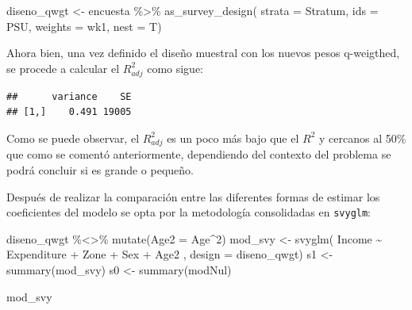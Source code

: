 \documentclass[
  12pt,
]{book}
\newenvironment{Shaded}{\begin{snugshade}}{\end{snugshade}}
\newcommand{\AttributeTok}[1]{\textcolor[rgb]{0.77,0.63,0.00}{#1}}
\newcommand{\DecValTok}[1]{\textcolor[rgb]{0.00,0.00,0.81}{#1}}
\newcommand{\FunctionTok}[1]{\textcolor[rgb]{0.00,0.00,0.00}{#1}}
\newcommand{\NormalTok}[1]{#1}
\newcommand{\OtherTok}[1]{\textcolor[rgb]{0.56,0.35,0.01}{#1}}
\newcommand{\SpecialCharTok}[1]{\textcolor[rgb]{0.00,0.00,0.00}{#1}}
\begin{document}
\begin{Shaded}
\begin{Highlighting}[]
\NormalTok{diseno\_qwgt }\OtherTok{\textless{}{-}}\NormalTok{ encuesta }\SpecialCharTok{\%\textgreater{}\%}
  \FunctionTok{as\_survey\_design}\NormalTok{(}
    \AttributeTok{strata =}\NormalTok{ Stratum,}
    \AttributeTok{ids =}\NormalTok{ PSU,}
    \AttributeTok{weights =}\NormalTok{ wk1,}
    \AttributeTok{nest =}\NormalTok{ T)}
\end{Highlighting}
\end{Shaded}

Ahora bien, una vez definido el diseño muestral con los nuevos pesos q-weigthed, se procede a calcular el \(R_{adj}^{2}\) como sigue:

\begin{Shaded}
\end{Shaded}

\begin{verbatim}
##      variance    SE
## [1,]    0.491 19005
\end{verbatim}

Como se puede observar, el \(R_{adj}^{2}\) es un poco más bajo que el \(R^{2}\) y cercanos al 50\% que como se comentó anteriormente, dependiendo del contexto del problema se podrá concluir si es grande o pequeño.

Después de realizar la comparación entre las diferentes formas de estimar los coeficientes del modelo se opta por la metodología consolidadas en \texttt{svyglm}:

\begin{Shaded}
\begin{Highlighting}[]
\NormalTok{diseno\_qwgt }\SpecialCharTok{\%\textless{}\textgreater{}\%} \FunctionTok{mutate}\NormalTok{(}\AttributeTok{Age2 =}\NormalTok{ Age}\SpecialCharTok{\^{}}\DecValTok{2}\NormalTok{) }
\NormalTok{mod\_svy }\OtherTok{\textless{}{-}} \FunctionTok{svyglm}\NormalTok{( Income }\SpecialCharTok{\textasciitilde{}}\NormalTok{ Expenditure }\SpecialCharTok{+}\NormalTok{ Zone }\SpecialCharTok{+}\NormalTok{ Sex }\SpecialCharTok{+}\NormalTok{ Age2 ,}
                       \AttributeTok{design =}\NormalTok{ diseno\_qwgt)}
\NormalTok{s1 }\OtherTok{\textless{}{-}} \FunctionTok{summary}\NormalTok{(mod\_svy)}
\NormalTok{s0 }\OtherTok{\textless{}{-}} \FunctionTok{summary}\NormalTok{(modNul)}

\NormalTok{mod\_svy}
\end{Highlighting}
\end{Shaded}
\end{document}
